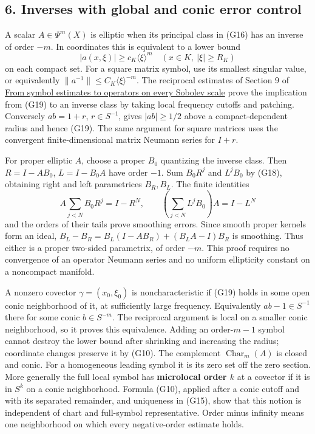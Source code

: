 \documentclass[
  11pt,
]{article}
\begin{document}
\subsection{6. Inverses with global and conic error
control}\label{inverses-with-global-and-conic-error-control}

A scalar \(A\in\Psi^m(X)\) is elliptic when its principal class in (G16)
has an inverse of order \(-m\). In coordinates this is equivalent to a
lower bound \[
|a(x,\xi)|\geq c_K\langle\xi\rangle^m
\quad(x\in K,\ |\xi|\geq R_K)
\tag{G19}
\] on each compact set. For a square matrix symbol, use its smallest
singular value, or equivalently
\(\|a^{-1}\|\leq C_K\langle\xi\rangle^{-m}\). The reciprocal estimates
of Section 9 of \href{euclidean-symbol-calculus.pdf}{From symbol
estimates to operators on every Sobolev scale} prove the implication
from (G19) to an inverse class by taking local frequency cutoffs and
patching. Conversely \(ab=1+r\), \(r\in S^{-1}\), gives \(|ab|\geq1/2\)
above a compact-dependent radius and hence (G19). The same argument for
square matrices uses the convergent finite-dimensional matrix Neumann
series for \(I+r\).

For proper elliptic \(A\), choose a proper \(B_0\) quantizing the
inverse class. Then \(R=I-AB_0\), \(L=I-B_0A\) have order \(-1\). Sum
\(B_0R^j\) and \(L^jB_0\) by (G18), obtaining right and left
parametrices \(B_R,B_L\). The finite identities \[
A\sum_{j<N}B_0R^j=I-R^N,
\qquad
\left(\sum_{j<N}L^jB_0\right)A=I-L^N
\tag{G20}
\] and the orders of their tails prove smoothing errors. Since smooth
proper kernels form an ideal, \(B_L-B_R=B_L(I-AB_R)+(B_LA-I)B_R\) is
smoothing. Thus either is a proper two-sided parametrix, of order
\(-m\). This proof requires no convergence of an operator Neumann series
and no uniform ellipticity constant on a noncompact manifold.

A nonzero covector \(\gamma=(x_0,\xi_0)\) is noncharacteristic if (G19)
holds in some open conic neighborhood of it, at sufficiently large
frequency. Equivalently \(ab-1\in S^{-1}\) there for some conic
\(b\in S^{-m}\). The reciprocal argument is local on a smaller conic
neighborhood, so it proves this equivalence. Adding an order-\(m-1\)
symbol cannot destroy the lower bound after shrinking and increasing the
radius; coordinate changes preserve it by (G10). The complement
\(\operatorname{Char}_m(A)\) is closed and conic. For a homogeneous
leading symbol it is its zero set off the zero section. More generally
the full local symbol has \textbf{microlocal order \(k\)} at a covector
if it is in \(S^k\) on a conic neighborhood. Formula (G10), applied
after a conic cutoff and with its separated remainder, and uniqueness in
(G15), show that this notion is independent of chart and full-symbol
representative. Order minus infinity means one neighborhood on which
every negative-order estimate holds.
\end{document}
